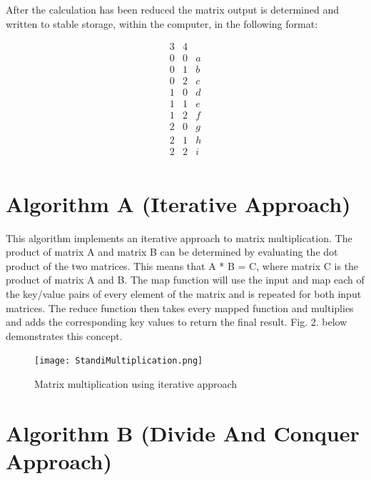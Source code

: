 \documentclass[conference]{IEEEtran}
\begin{document}
\noindent After the calculation has been reduced the matrix output is determined and written to stable storage, within the computer, in the following format:

\begin{equation*}
\begin{matrix}
3       &4      & \\
0       &0      &a\\
0       &1      &b\\
0       &2      &c\\
1       &0      &d\\
1       &1      &e\\
1       &2      &f\\
2       &0      &g\\
2       &1      &h\\
2       &2      &i\\
\end{matrix}
\end{equation*}

\section{Algorithm A (Iterative Approach)}

\noindent This algorithm implements an iterative approach to matrix multiplication. The product of matrix A and matrix B can be determined by evaluating the dot product of the two matrices. This means that A * B = C, where matrix C is the product of matrix A and B. The map function will use the input and map each of the key/value pairs of every element of the matrix and is repeated for both input matrices. The reduce function then takes every mapped function and multiplies and adds the corresponding key values to return the final result. Fig. 2. below demonstrates this concept.  


\noindent
\begin{figure}[H]
\centering
\texttt{[image: StandiMultiplication.png]}
\caption{Matrix multiplication using iterative approach}
\label{fig:circuit}
\end{figure}




\section{Algorithm B (Divide And Conquer Approach)}
\end{document}

